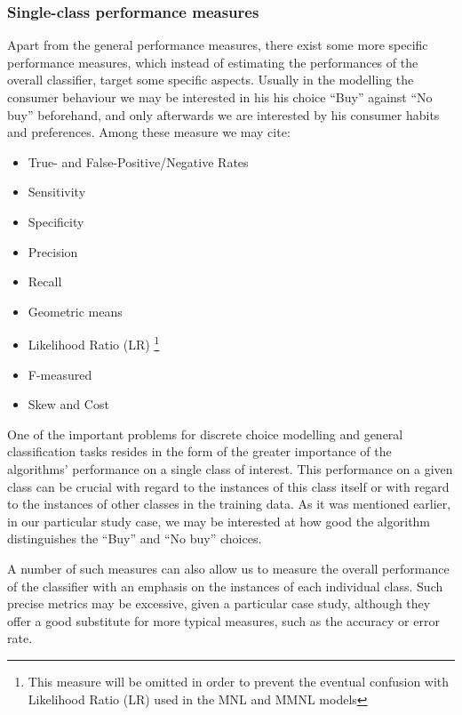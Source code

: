 \documentclass[12pt,]{article}
\let\rmarkdownfootnote\footnote%
\def\footnote{\protect\rmarkdownfootnote}
\begin{document}
\hypertarget{single-class-performance-measures}{%
\subsubsection{Single-class performance
measures}\label{single-class-performance-measures}}

Apart from the general performance measures, there exist some more
specific performance measures, which instead of estimating the
performances of the overall classifier, target some specific aspects.
Usually in the modelling the consumer behaviour we may be interested in
his his choice ``Buy'' against ``No buy'' beforehand, and only
afterwards we are interested by his consumer habits and preferences.
Among these measure we may cite:

\begin{multicols}{2}
\begin{itemize}
\item True- and False-Positive/Negative Rates
\item Sensitivity
\item Specificity
\item Precision 
\item Recall 
\item Geometric means
\item Likelihood Ratio (LR) \footnote{This measure will be omitted in order to prevent the eventual confusion with Likelihood Ratio (LR) used in the MNL and MMNL models}
\item F-measured
\item Skew and Cost 
\end{itemize}
\end{multicols}

One of the important problems for discrete choice modelling and general
classification tasks resides in the form of the greater importance of
the algorithms' performance on a single class of interest. This
performance on a given class can be crucial with regard to the instances
of this class itself or with regard to the instances of other classes in
the training data. As it was mentioned earlier, in our particular study
case, we may be interested at how good the algorithm distinguishes the
``Buy'' and ``No buy'' choices.

A number of such measures can also allow us to measure the overall
performance of the classifier with an emphasis on the instances of each
individual class. Such precise metrics may be excessive, given a
particular case study, although they offer a good substitute for more
typical measures, such as the accuracy or error rate.
\end{document}

